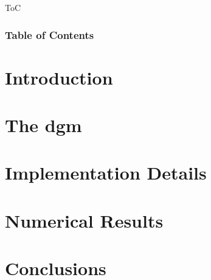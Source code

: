 
\begin{frame}{ToC}
    \frametitle{Table of Contents}

    \vspace*{\fill}
    \tableofcontents[hideallsubsections]
    \vspace*{\fill}
\end{frame}



\section{Introduction}




\section{The \texorpdfstring{\acrlong{dgm}}{}}




\section{Implementation Details}




\section{Numerical Results}




\section{Conclusions}

